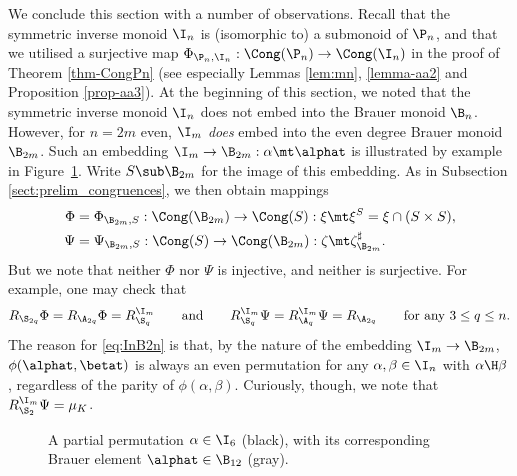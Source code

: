 We conclude this section with a number of observations.
Recall that the symmetric inverse monoid $\I_n$ is (isomorphic to) a submonoid of $\P_n$, and that we utilised a surjective map $\Phi_{\P_n,\I_n}:\Cong(\P_n)\to\Cong(\I_n)$ in the proof of Theorem \ref{thm-CongPn} (see especially Lemmas \ref{lem:mn}, \ref{lemma-aa2} and Proposition \ref{prop-aa3}).  
%
At the beginning of this section, we noted that the symmetric inverse monoid $\I_n$ does not embed into the Brauer monoid $\B_{n}$.  
However, for $n=2m$ even, 
$\I_m$ \emph{does} embed into the even degree Brauer monoid $\B_{2m}$.
Such an embedding $\I_m\to\B_{2m}:\alpha\mt\alphat$ is illustrated by example in Figure~\ref{fig:ImB2m}.  Write $S\sub\B_{2m}$ for the image of this embedding.  As in Subsection \ref{sect:prelim_congruences}, we then obtain mappings
\begin{align*}
\Phi&=\Phi_{\B_{2m},S}:\Cong(\B_{2m})\to\Cong(S):\xi\mt\xi^S=\xi\cap(S\times S),\\
\Psi&=\Psi_{\B_{2m},S}:\Cong(S)\to\Cong(\B_{2m}):\zeta\mt\zeta_{\B_{2m}}^\sharp.
\end{align*}
But we note that neither $\Phi$ nor $\Psi$ is injective, and neither is surjective.  For example, one may check that
\begin{equation}\label{eq:InB2n}
R_{\S_{2q}}\Phi=R_{\A_{2q}}\Phi=R_{\S_q}^{\I_m} \qquad\text{and}\qquad
R^{\I_m}_{\S_{q}}\Psi=R^{\I_m}_{\A_{q}}\Psi=R_{\A_{2q}} \qquad\text{for any $3\leq q\leq n$.}
\end{equation}
The reason for \eqref{eq:InB2n} is that, by the nature of the embedding $\I_m\to\B_{2m}$, $\phi(\alphat,\betat)$ is always an even permutation for any $\alpha,\beta\in\I_n$ with $\alpha\H\beta$, regardless of the parity of $\phi(\alpha,\beta)$.
%
Curiously, though, we note that $R_{\S_2}^{\I_m}\Psi=\mu_K$.  


\begin{figure}[ht]
\begin{center}
\end{center}
\vspace{-5mm}
\caption{A partial permutation $\alpha\in\I_6$ (black), with its corresponding Brauer element $\alphat\in\B_{12}$ (gray).}
\label{fig:ImB2m}
\end{figure}



